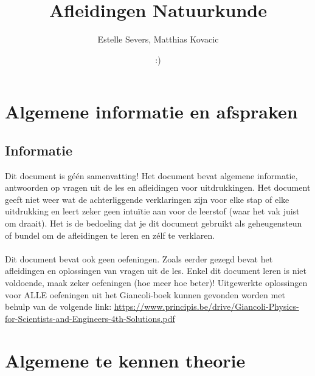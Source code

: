 \documentclass[12pt,a4paper]{article}
\author{Estelle Severs, Matthias Kovacic}
\title{Afleidingen Natuurkunde}
\date{:)}
\begin{document}
    \maketitle
    \tableofcontents
    \newpage


    \section{Algemene informatie en afspraken}
    \subsection{Informatie}
    Dit document is géén samenvatting! Het document bevat algemene informatie, antwoorden
    op vragen uit de les en afleidingen voor uitdrukkingen. Het document geeft niet weer wat de 
    achterliggende verklaringen zijn voor elke stap of elke uitdrukking en leert zeker geen intuïtie
    aan voor de leerstof (waar het vak juist om draait). Het is de bedoeling dat je dit document
    gebruikt als geheugensteun of bundel om de afleidingen te leren en zélf te verklaren. \\
    \\
    Dit document bevat ook geen oefeningen. Zoals eerder gezegd bevat het afleidingen en oplossingen
    van vragen uit de les. Enkel dit document leren is niet voldoende, maak zeker oefeningen (hoe meer
    hoe beter)! Uitgewerkte oplossingen voor ALLE oefeningen uit het Giancoli-boek kunnen gevonden worden met behulp 
    van de volgende link: \url{https://www.principis.be/drive/Giancoli-Physics-for-Scientists-and-Engineers-4th-Solutions.pdf}

    \section{Algemene te kennen theorie}
\end{document}

